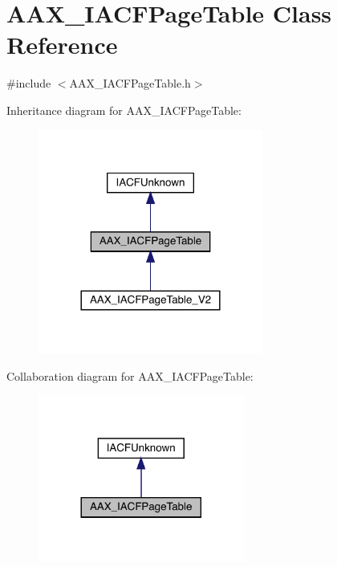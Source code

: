 \hypertarget{a01725}{}\section{A\+A\+X\+\_\+\+I\+A\+C\+F\+Page\+Table Class Reference}
\label{a01725}


{\ttfamily \#include $<$A\+A\+X\+\_\+\+I\+A\+C\+F\+Page\+Table.\+h$>$}



Inheritance diagram for A\+A\+X\+\_\+\+I\+A\+C\+F\+Page\+Table\+:
\nopagebreak
\begin{figure}[H]
\begin{center}
\leavevmode
\includegraphics[width=209pt]{a01724}
\end{center}
\end{figure}


Collaboration diagram for A\+A\+X\+\_\+\+I\+A\+C\+F\+Page\+Table\+:
\nopagebreak
\begin{figure}[H]
\begin{center}
\leavevmode
\includegraphics[width=192pt]{a01723}
\end{center}
\end{figure}


